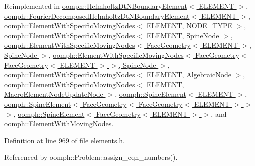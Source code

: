 Reimplemented in \hyperlink{classoomph_1_1HelmholtzDtNBoundaryElement_aefb821cc3b61a602ab5ca9dd9d843a63}{oomph\+::\+Helmholtz\+Dt\+N\+Boundary\+Element$<$ E\+L\+E\+M\+E\+N\+T $>$}, \hyperlink{classoomph_1_1FourierDecomposedHelmholtzDtNBoundaryElement_a7d8941de400e6f9497ae80ce24fee6cd}{oomph\+::\+Fourier\+Decomposed\+Helmholtz\+Dt\+N\+Boundary\+Element$<$ E\+L\+E\+M\+E\+N\+T $>$}, \hyperlink{classoomph_1_1ElementWithSpecificMovingNodes_ae54ee1d8772757d72d9df3e7229d8ecf}{oomph\+::\+Element\+With\+Specific\+Moving\+Nodes$<$ E\+L\+E\+M\+E\+N\+T, N\+O\+D\+E\+\_\+\+T\+Y\+P\+E $>$}, \hyperlink{classoomph_1_1ElementWithSpecificMovingNodes_ae54ee1d8772757d72d9df3e7229d8ecf}{oomph\+::\+Element\+With\+Specific\+Moving\+Nodes$<$ E\+L\+E\+M\+E\+N\+T, Spine\+Node $>$}, \hyperlink{classoomph_1_1ElementWithSpecificMovingNodes_ae54ee1d8772757d72d9df3e7229d8ecf}{oomph\+::\+Element\+With\+Specific\+Moving\+Nodes$<$ Face\+Geometry$<$ E\+L\+E\+M\+E\+N\+T $>$, Spine\+Node $>$}, \hyperlink{classoomph_1_1ElementWithSpecificMovingNodes_ae54ee1d8772757d72d9df3e7229d8ecf}{oomph\+::\+Element\+With\+Specific\+Moving\+Nodes$<$ Face\+Geometry$<$ Face\+Geometry$<$ E\+L\+E\+M\+E\+N\+T $>$ $>$, Spine\+Node $>$}, \hyperlink{classoomph_1_1ElementWithSpecificMovingNodes_ae54ee1d8772757d72d9df3e7229d8ecf}{oomph\+::\+Element\+With\+Specific\+Moving\+Nodes$<$ E\+L\+E\+M\+E\+N\+T, Algebraic\+Node $>$}, \hyperlink{classoomph_1_1ElementWithSpecificMovingNodes_ae54ee1d8772757d72d9df3e7229d8ecf}{oomph\+::\+Element\+With\+Specific\+Moving\+Nodes$<$ E\+L\+E\+M\+E\+N\+T, Macro\+Element\+Node\+Update\+Node $>$}, \hyperlink{classoomph_1_1SpineElement_a867b5e4eb64d60da9585f8a791fbac36}{oomph\+::\+Spine\+Element$<$ E\+L\+E\+M\+E\+N\+T $>$}, \hyperlink{classoomph_1_1SpineElement_a867b5e4eb64d60da9585f8a791fbac36}{oomph\+::\+Spine\+Element$<$ Face\+Geometry$<$ Face\+Geometry$<$ E\+L\+E\+M\+E\+N\+T $>$ $>$ $>$}, \hyperlink{classoomph_1_1SpineElement_a867b5e4eb64d60da9585f8a791fbac36}{oomph\+::\+Spine\+Element$<$ Face\+Geometry$<$ E\+L\+E\+M\+E\+N\+T $>$ $>$}, and \hyperlink{classoomph_1_1ElementWithMovingNodes_a6d2fa178f36d4b8413a9ce4f24e9c87e}{oomph\+::\+Element\+With\+Moving\+Nodes}.



Definition at line 969 of file elements.\+h.



Referenced by oomph\+::\+Problem\+::assign\+\_\+eqn\+\_\+numbers().

\mbox{\label{classoomph_1_1GeneralisedElement_af2025a472df6752a946739da58e7fb37}} 
